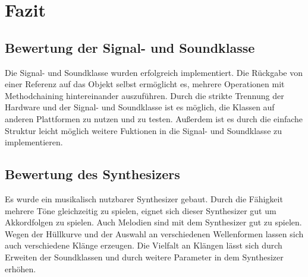 \section{Fazit}

\subsection{Bewertung der Signal- und Soundklasse}

Die Signal- und Soundklasse wurden erfolgreich implementiert. Die Rückgabe von 
einer Referenz auf das Objekt selbst ermöglicht es, mehrere Operationen mit 
Methodchaining 
hintereinander auszuführen. Durch die strikte Trennung der Hardware und 
der Signal- und Soundklasse ist es möglich, die Klassen auf anderen 
Plattformen zu nutzen und zu testen. Außerdem ist es durch die einfache Struktur
 leicht möglich
weitere Fuktionen in die Signal- und Soundklasse zu implementieren.

\subsection{Bewertung des Synthesizers}

Es wurde ein musikalisch nutzbarer Synthesizer
gebaut. Durch die Fähigkeit mehrere 
Töne gleichzeitig zu spielen, eignet sich dieser Synthesizer gut um Akkordfolgen
zu spielen. Auch Melodien sind mit dem Synthesizer gut zu spielen.
Wegen der Hüllkurve und der Auswahl an verschiedenen Wellenformen
lassen sich auch verschiedene Klänge erzeugen. Die Vielfalt an Klängen 
lässt sich durch Erweiten der Soundklassen und durch weitere Parameter
in dem Synthesizer erhöhen.